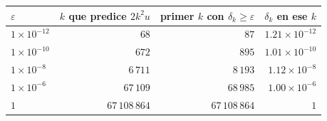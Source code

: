 \begin{tabular}{lrrr}
\toprule
$\varepsilon$ & $k$ que predice $2k^{2}u$ & primer $k$ con $\delta_k \ge \varepsilon$ & $\delta_k$ en ese $k$ \\
\midrule
$1 \times 10^{-12}$ & $68$ & $87$ & $1.21 \times 10^{-12}$ \\
$1 \times 10^{-10}$ & $672$ & $895$ & $1.01 \times 10^{-10}$ \\
$1 \times 10^{-8}$ & $6\,711$ & $8\,193$ & $1.12 \times 10^{-8}$ \\
$1 \times 10^{-6}$ & $67\,109$ & $68\,985$ & $1.00 \times 10^{-6}$ \\
$1$ & $67\,108\,864$ & $67\,108\,864$ & $1$ \\
\bottomrule
\end{tabular}
